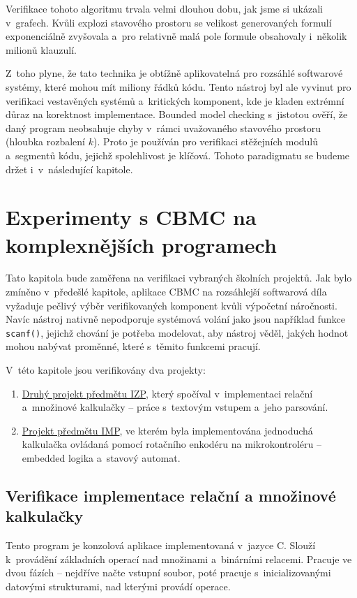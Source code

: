 \documentclass[a4paper, 11pt]{article}
\begin{document}
Verifikace tohoto algoritmu trvala velmi dlouhou dobu, jak jsme si ukázali v~grafech.
Kvůli explozi stavového prostoru se velikost generovaných formulí exponenciálně zvyšovala a~pro relativně malá pole formule obsahovaly i~několik milionů klauzulí.

Z~toho plyne, že tato technika je obtížně aplikovatelná pro rozsáhlé softwarové systémy, které mohou mít miliony řádků kódu.
Tento nástroj byl ale vyvinut pro verifikaci vestavěných systémů a~kritických komponent, kde je kladen extrémní důraz na korektnost implementace.
Bounded model checking s~jistotou ověří, že daný program neobsahuje chyby v~rámci uvažovaného stavového prostoru (hloubka rozbalení $k$).
Proto je používán pro verifikaci stěžejních modulů a~segmentů kódu, jejichž spolehlivost je klíčová.
Tohoto paradigmatu se budeme držet i~v~následující kapitole.

\section{Experimenty s CBMC na komplexnějších programech}\label{sec:CBMC_Experiments}
Tato kapitola bude zaměřena na verifikaci vybraných školních projektů.
Jak bylo zmíněno v~předešlé kapitole, aplikace CBMC na rozsáhlejší softwarová díla vyžaduje pečlivý výběr verifikovaných komponent kvůli výpočetní náročnosti.
Navíc nástroj nativně nepodporuje systémová volání jako jsou například funkce \texttt{scanf()}, jejichž chování je potřeba modelovat, aby nástroj věděl, jakých hodnot mohou nabývat proměnné, které s~těmito funkcemi pracují.

V~této kapitole jsou verifikovány dva projekty:
\begin{enumerate}
    \item \href{https://github.com/MOONYROS/VUT-IZP-project-2/tree/main}{Druhý projekt předmětu IZP}, který spočíval v~implementaci relační a~množinové kalkulačky -- práce s~textovým vstupem a~jeho parsování.
    \item \href{https://github.com/Kumismar/FIT-VUT/tree/main/bc/IMP}{Projekt předmětu IMP}, ve kterém byla implementována jednoduchá kalkulačka ovládaná pomocí rotačního enkodéru na mikrokontroléru -- embedded logika a~stavový automat.
\end{enumerate}

\subsection{Verifikace implementace relační a množinové kalkulačky}\label{sec:CBMC_Experiments_IZP}
Tento program je konzolová aplikace implementovaná v~jazyce C.
Slouží k~provádění základních operací nad množinami a~binárními relacemi.
Pracuje ve dvou fázích -- nejdříve načte vstupní soubor, poté pracuje s~inicializovanými datovými strukturami, nad kterými provádí operace.
\end{document}
